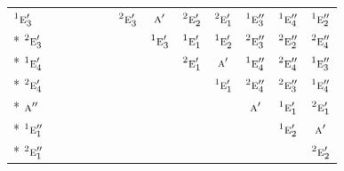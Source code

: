 \documentclass[10pt,a4paper]{article}
\numberwithin{equation}{section}
\newcommand{\irr}[1]{\text{\normalfont\scshape #1}}
\newcommand{\conjpair}[1]{{}^{#1}}
\begin{document}
{\begin{longtable}{@{}lcccccccccccc@{}}
$\conjpair{1}\irr{e}_{3}'$ &  &  &  &  &  & $\conjpair{2}\irr{e}_{3}'$ & $\irr{a}'$ & $\conjpair{2}\irr{e}_{2}'$ & $\conjpair{2}\irr{e}_{1}'$ & $\conjpair{1}\irr{e}_{3}''$ & $\conjpair{1}\irr{e}_{4}''$ & $\conjpair{1}\irr{e}_{2}''$\\*
$\conjpair{2}\irr{e}_{3}'$ &  &  &  &  &  &  & $\conjpair{1}\irr{e}_{3}'$ & $\conjpair{1}\irr{e}_{1}'$ & $\conjpair{1}\irr{e}_{2}'$ & $\conjpair{2}\irr{e}_{3}''$ & $\conjpair{2}\irr{e}_{2}''$ & $\conjpair{2}\irr{e}_{4}''$\\*
$\conjpair{1}\irr{e}_{4}'$ &  &  &  &  &  &  &  & $\conjpair{2}\irr{e}_{1}'$ & $\irr{a}'$ & $\conjpair{1}\irr{e}_{4}''$ & $\conjpair{2}\irr{e}_{4}''$ & $\conjpair{1}\irr{e}_{3}''$\\*
$\conjpair{2}\irr{e}_{4}'$ &  &  &  &  &  &  &  &  & $\conjpair{1}\irr{e}_{1}'$ & $\conjpair{2}\irr{e}_{4}''$ & $\conjpair{2}\irr{e}_{3}''$ & $\conjpair{1}\irr{e}_{4}''$\\*
$\irr{a}''$ &  &  &  &  &  &  &  &  &  & $\irr{a}'$ & $\conjpair{1}\irr{e}_{1}'$ & $\conjpair{2}\irr{e}_{1}'$\\*
$\conjpair{1}\irr{e}_{1}''$ &  &  &  &  &  &  &  &  &  &  & $\conjpair{1}\irr{e}_{2}'$ & $\irr{a}'$\\*
$\conjpair{2}\irr{e}_{1}''$ &  &  &  &  &  &  &  &  &  &  &  & $\conjpair{2}\irr{e}_{2}'$\\
\bottomrule\end{longtable}}
\end{document}
